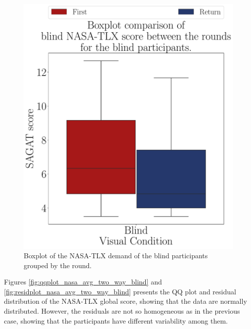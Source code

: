 \begin{figure}[!htb]
\begin{minipage}{0.45\textwidth}
        \includegraphics[width = \textwidth]{Resultados/Nasa/Figuras/pdf/boxplot_nasa_blind_rounds.pdf}
        \caption{Boxplot of the NASA-TLX demand of the blind participants grouped by the round.}
        \label{fig:boxplot_nasa_blind_rounds}
    \end{minipage}
\end{figure}

Figures \ref{fig:qqplot_nasa_avg_two_way_blind} and \ref{fig:residplot_nasa_avg_two_way_blind} presents the QQ plot and residual distribution of the NASA-TLX global score, showing that the data are normally distributed. However, the residuals are not so homogeneous as in the previous case, showing that the participants have different variability among them.

